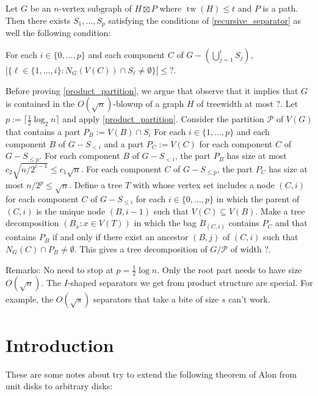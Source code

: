 \documentclass{patmorin}
\renewcommand{\le}{\leqslant}
\DeclareMathOperator{\tw}{tw}
\begin{document}
\begin{lem}\label{product_partition}
  Let $G$ be an $n$-vertex subgraph of $H\boxtimes P$ where $\tw(H)\le t$ and $P$ is a path.  Then there exists $S_1,\ldots,S_p$ satisfying the conditions of \cref{recursive_separator} as well the following condition:
  \begin{compactenum}[(a)]\setcounter{enumi}{4}
    \item For each $i\in\{0,\ldots,p\}$ and each component $C$ of $G-(\bigcup_{j=1}^i S_j)$, $|\{\ell\in\{1,\ldots,i\}:N_G(V(C))\cap S_\ell\neq\emptyset\}|\le ?$.
  \end{compactenum}
\end{lem}

Before proving \cref{product_partition}, we argue that observe that it implies that $G$ is contained in the $O(\sqrt{n})$-blowup of a graph $H$ of treewidth at most $?$. Let $p:=\lceil \tfrac12\log_2 n\rceil$ and apply \cref{product_partition}.  Consider the partition $\mathcal{P}$ of $V(G)$ that contains a part $P_B:=V(B)\cap S_i$ For each $i\in\{1,\ldots,p\}$ and each component $B$ of $G-S_{<i}$ and a part $P_C:=V(C)$ for each component $C$ of $G-S_{\le p}$.
For each component $B$ of $G-S_{<i}$, the part $P_{B}$ has size at most $c_2\sqrt{n/2^{i-1}}\le c_1\sqrt{n}$.  For each component $C$ of $G-S_{\le p}$, the part $P_C$ has size at most $n/2^p \le \sqrt{n}$.  Define a tree $T$ with whose vertex set includes a node $(C,i)$ for each component $C$ of $G-S_{\le i}$ for each $i\in\{0,\ldots,p\}$ in which the parent of $(C,i)$ is the unique node $(B,i-1)$ such that $V(C)\subseteq V(B)$.
Make a tree decomposition $(B_x:x\in V(T))$ in which the bag $B_{(C,i)}$ contains $P_C$ and that contains $P_B$ if and only if there exist an ancestor $(B,j)$ of $(C,i)$ such that $N_G(C)\cap P_B\neq\emptyset$.  This gives a tree decomposition of $G/\mathcal{P}$ of width $?$.

Remarks: No need to stop at $p=\tfrac12\log n$.  Only the root part needs to have size $O(\sqrt{n})$.  The $I$-shaped separators we get from product structure are special.  For example, the $O(\sqrt{s})$ separators that take a bite of size $s$ can't work.





\section{Introduction}

These are some notes about try to extend the following theorem of Alon from unit disks to arbitrary disks:
\end{document}
